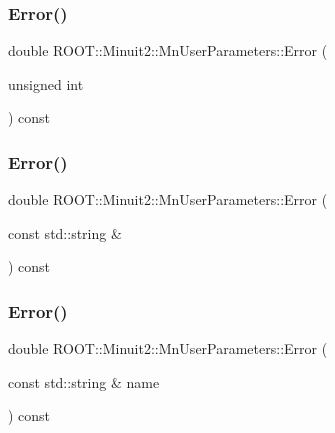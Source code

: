 \subsubsection{\texorpdfstring{Error()}{Error()}\hspace{0.1cm}{\footnotesize\ttfamily [3/6]}}
{\footnotesize\ttfamily double R\+O\+O\+T\+::\+Minuit2\+::\+Mn\+User\+Parameters\+::\+Error (\begin{DoxyParamCaption}\item[{unsigned int}]{ }\end{DoxyParamCaption}) const}

\mbox{\label{classROOT_1_1Minuit2_1_1MnUserParameters_a52dd385b551b309d26d0dc30581c0b56}} 
\subsubsection{\texorpdfstring{Error()}{Error()}\hspace{0.1cm}{\footnotesize\ttfamily [4/6]}}
{\footnotesize\ttfamily double R\+O\+O\+T\+::\+Minuit2\+::\+Mn\+User\+Parameters\+::\+Error (\begin{DoxyParamCaption}\item[{const std\+::string \&}]{ }\end{DoxyParamCaption}) const}

\mbox{\label{classROOT_1_1Minuit2_1_1MnUserParameters_a52dd385b551b309d26d0dc30581c0b56}} 
\subsubsection{\texorpdfstring{Error()}{Error()}\hspace{0.1cm}{\footnotesize\ttfamily [5/6]}}
{\footnotesize\ttfamily double R\+O\+O\+T\+::\+Minuit2\+::\+Mn\+User\+Parameters\+::\+Error (\begin{DoxyParamCaption}\item[{const std\+::string \&}]{name }\end{DoxyParamCaption}) const}

